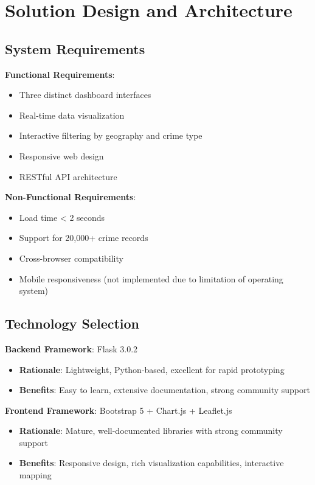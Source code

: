 \documentclass[12pt,a4paper]{article}
\begin{document}
\section{Solution Design and Architecture}

\subsection{System Requirements}

\textbf{Functional Requirements}:
\begin{itemize}
    \item Three distinct dashboard interfaces
    \item Real-time data visualization
    \item Interactive filtering by geography and crime type
    \item Responsive web design
    \item RESTful API architecture
\end{itemize}

\textbf{Non-Functional Requirements}:
\begin{itemize}
    \item Load time < 2 seconds
    \item Support for 20,000+ crime records
    \item Cross-browser compatibility
    \item Mobile responsiveness (not implemented due to limitation of operating system)
\end{itemize}

\subsection{Technology Selection}

\textbf{Backend Framework}: Flask 3.0.2
\begin{itemize}
    \item \textbf{Rationale}: Lightweight, Python-based, excellent for rapid prototyping
    \item \textbf{Benefits}: Easy to learn, extensive documentation, strong community support
\end{itemize}

\textbf{Frontend Framework}: Bootstrap 5 + Chart.js + Leaflet.js
\begin{itemize}
    \item \textbf{Rationale}: Mature, well-documented libraries with strong community support
    \item \textbf{Benefits}: Responsive design, rich visualization capabilities, interactive mapping
\end{itemize}
\end{document}
